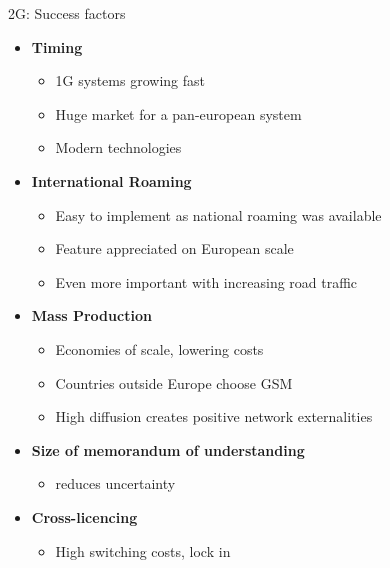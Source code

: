 \begin{frame}{2G: Success factors}
  \begin{itemize}
    \item \textbf{Timing}
    \begin{itemize}
      \item 1G systems growing fast
      \item Huge market for a pan-european system
      \item Modern technologies 
    \end{itemize}
    \item \textbf{International Roaming}
    \begin{itemize}
      \item Easy to implement as national roaming was available
      \item Feature appreciated on European scale
      \item Even more important with increasing road traffic 
    \end{itemize}
    \item \textbf{Mass Production}
    \begin{itemize}
      \item Economies of scale, lowering costs
      \item Countries outside Europe choose GSM
      \item High diffusion creates positive network externalities
    \end{itemize}
    \item \textbf{Size of memorandum of understanding}
    \begin{itemize}
      \item reduces uncertainty
    \end{itemize}
    \item \textbf{Cross-licencing}
    \begin{itemize}
      \item High switching costs, lock in
    \end{itemize} 
  \end{itemize}
\end{frame}

